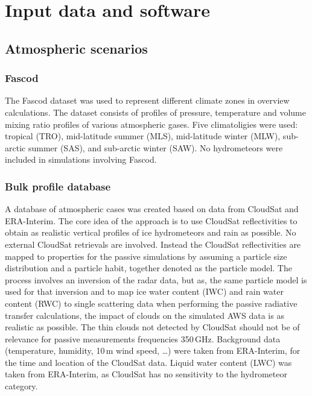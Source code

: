 \documentclass[12pt]{article}
\begin{document}
\section{Input data and software}

\subsection{Atmospheric scenarios}

\subsubsection{Fascod}
\label{sec:fascod}
%
The Fascod dataset \citep{anderson1986afgl} was used to represent different
climate zones in overview calculations. The dataset consists of profiles of
pressure, temperature and volume mixing ratio profiles of various atmospheric
gases. Five climatoligies were used: tropical (TRO), mid-latitude summer (MLS),
mid-latitude winter (MLW), sub-arctic summer (SAS), and sub-arctic winter
(SAW). No hydrometeors were included in simulations involving Fascod.


\subsubsection{Bulk profile database}
%
A database of atmospheric cases was created based on data from CloudSat and
ERA-Interim. The core idea of the approach is to use CloudSat reflectivities to
obtain as realistic vertical profiles of ice hydrometeors and rain as
possible. No external CloudSat retrievals are involved. Instead the CloudSat
reflectivities are mapped to properties for the passive simulations by assuming
a particle size distribution and a particle habit, together denoted as
the particle model. The process involves an inversion of the radar data, but as,
the same particle model is used for that inversion and to map ice water content
(IWC) and rain water content (RWC) to single scattering data when performing
the passive radiative transfer calculations, the impact of clouds on the
simulated AWS data is as realistic as possible. The thin clouds not detected by
CloudSat should not be of relevance for passive measurements frequencies
350\,GHz. Background data (temperature, humidity, 10\,m wind speed, \dots) were
taken from ERA-Interim, for the time and location of the CloudSat data. Liquid
water content (LWC) was taken from ERA-Interim, as CloudSat has no sensitivity
to the hydrometeor category.
\end{document}
